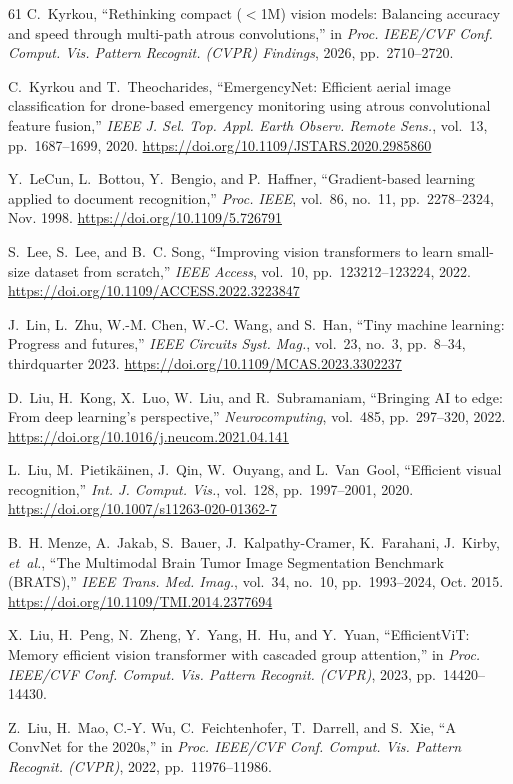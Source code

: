 ﻿\documentclass[journal]{IEEEtran}
\providecommand{\doi}[1]{\url{https://doi.org/#1}}
\begin{document}
\begin{thebibliography}{61}
C.~Kyrkou, ``Rethinking compact ($<$1M) vision models: Balancing accuracy and speed through multi-path atrous convolutions,'' in \emph{Proc. IEEE/CVF Conf. Comput. Vis. Pattern Recognit. (CVPR) Findings}, 2026, pp.~2710--2720.

C.~Kyrkou and T.~Theocharides, ``EmergencyNet: Efficient aerial image classification for drone-based emergency monitoring using atrous convolutional feature fusion,'' \emph{IEEE J. Sel. Top. Appl. Earth Observ. Remote Sens.}, vol.~13, pp.~1687--1699, 2020. \doi{10.1109/JSTARS.2020.2985860}

Y.~LeCun, L.~Bottou, Y.~Bengio, and P.~Haffner, ``Gradient-based learning applied to document recognition,'' \emph{Proc. IEEE}, vol.~86, no.~11, pp.~2278--2324, Nov. 1998. \doi{10.1109/5.726791}

S.~Lee, S.~Lee, and B.~C. Song, ``Improving vision transformers to learn small-size dataset from scratch,'' \emph{IEEE Access}, vol.~10, pp.~123212--123224, 2022. \doi{10.1109/ACCESS.2022.3223847}

J.~Lin, L.~Zhu, W.-M. Chen, W.-C. Wang, and S.~Han, ``Tiny machine learning: Progress and futures,'' \emph{IEEE Circuits Syst. Mag.}, vol.~23, no.~3, pp.~8--34, thirdquarter 2023. \doi{10.1109/MCAS.2023.3302237}

D.~Liu, H.~Kong, X.~Luo, W.~Liu, and R.~Subramaniam, ``Bringing AI to edge: From deep learning's perspective,'' \emph{Neurocomputing}, vol.~485, pp.~297--320, 2022. \doi{10.1016/j.neucom.2021.04.141}

L.~Liu, M.~Pietik{\"a}inen, J.~Qin, W.~Ouyang, and L.~Van~Gool, ``Efficient visual recognition,'' \emph{Int. J. Comput. Vis.}, vol.~128, pp.~1997--2001, 2020. \doi{10.1007/s11263-020-01362-7}

B.~H. Menze, A.~Jakab, S.~Bauer, J.~Kalpathy-Cramer, K.~Farahani, J.~Kirby, \emph{et~al.}, ``The Multimodal Brain Tumor Image Segmentation Benchmark (BRATS),'' \emph{IEEE Trans. Med. Imag.}, vol.~34, no.~10, pp.~1993--2024, Oct. 2015. \doi{10.1109/TMI.2014.2377694}

X.~Liu, H.~Peng, N.~Zheng, Y.~Yang, H.~Hu, and Y.~Yuan, ``EfficientViT: Memory efficient vision transformer with cascaded group attention,'' in \emph{Proc. IEEE/CVF Conf. Comput. Vis. Pattern Recognit. (CVPR)}, 2023, pp.~14420--14430.

Z.~Liu, H.~Mao, C.-Y. Wu, C.~Feichtenhofer, T.~Darrell, and S.~Xie, ``A ConvNet for the 2020s,'' in \emph{Proc. IEEE/CVF Conf. Comput. Vis. Pattern Recognit. (CVPR)}, 2022, pp.~11976--11986.


\end{thebibliography}
\end{document}
